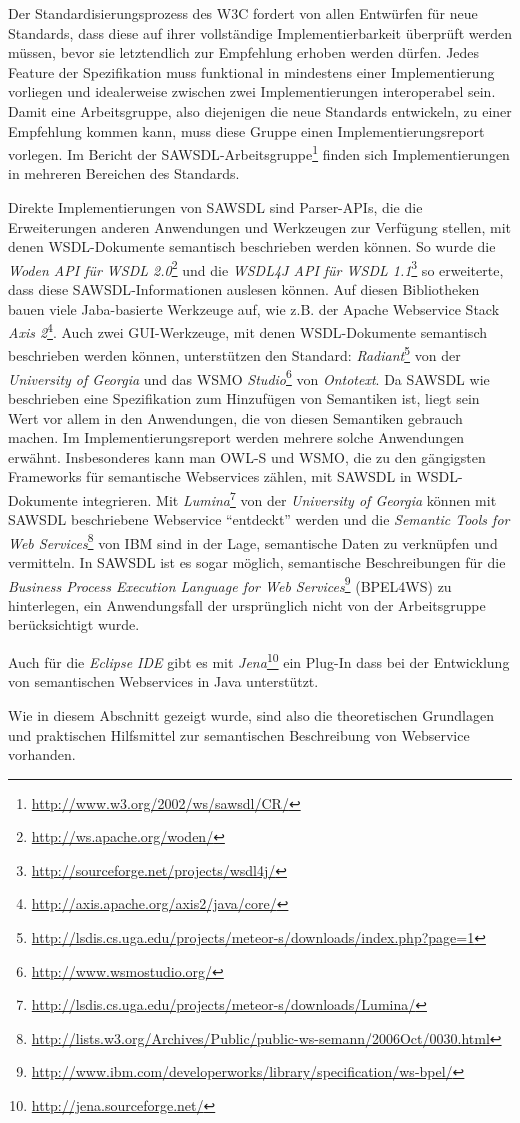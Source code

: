 Der Standardisierungsprozess des \ac{W3C} fordert von allen Entwürfen für neue Standards, dass diese auf ihrer vollständige Implementierbarkeit überprüft werden müssen, bevor sie letztendlich zur Empfehlung erhoben werden dürfen. Jedes Feature der Spezifikation muss funktional in mindestens einer Implementierung vorliegen und idealerweise zwischen zwei Implementierungen interoperabel sein. Damit eine Arbeitsgruppe, also diejenigen die neue Standards entwickeln, zu einer Empfehlung kommen kann, muss diese Gruppe einen Implementierungsreport vorlegen. Im Bericht der \ac{SAWSDL}-Arbeitsgruppe\footnote{\url{http://www.w3.org/2002/ws/sawsdl/CR/}} finden sich Implementierungen in mehreren Bereichen des Standards.

Direkte Implementierungen von \ac{SAWSDL} sind Parser-\ac{API}s, die die Erweiterungen anderen Anwendungen und Werkzeugen zur Verfügung stellen, mit denen \ac{WSDL}-Dokumente semantisch beschrieben werden können. So wurde die \emph{Woden API für WSDL 2.0}\footnote{\url{http://ws.apache.org/woden/}} und die \emph{WSDL4J API für WSDL
1.1}\footnote{\url{http://sourceforge.net/projects/wsdl4j/}} so erweiterte, dass diese \ac{SAWSDL}-Informationen auslesen können. Auf diesen Bibliotheken bauen viele Jaba-basierte Werkzeuge auf, wie z.B. der Apache Webservice Stack \emph{Axis 2}\footnote{\url{http://axis.apache.org/axis2/java/core/}}. Auch zwei GUI-Werkzeuge, mit denen \ac{WSDL}-Dokumente semantisch beschrieben werden können, unterstützen den Standard: \emph{Radiant}\footnote{\url{http://lsdis.cs.uga.edu/projects/meteor-s/downloads/index.php?page=1}} von der \emph{University of Georgia} und das \acl{WSMO} \emph{Studio}\footnote{\url{http://www.wsmostudio.org/}} von \emph{Ontotext}. Da \ac{SAWSDL} wie beschrieben eine Spezifikation zum Hinzufügen von Semantiken ist, liegt sein Wert vor allem in den Anwendungen, die von diesen Semantiken gebrauch machen. Im Implementierungsreport werden mehrere solche Anwendungen erwähnt.
Insbesonderes kann man \ac{OWL-S} und \ac{WSMO}, die zu den gängigsten Frameworks für semantische Webservices zählen,  mit \ac{SAWSDL} in \ac{WSDL}-Dokumente integrieren. Mit \emph{Lumina}\footnote{\url{http://lsdis.cs.uga.edu/projects/meteor-s/downloads/Lumina/}} von der \emph{University of Georgia} können mit \ac{SAWSDL} beschriebene Webservice "`entdeckt"' werden und die \emph{Semantic Tools for Web Services}\footnote{\url{http://lists.w3.org/Archives/Public/public-ws-semann/2006Oct/0030.html}} von IBM sind in der Lage, semantische Daten zu verknüpfen und vermitteln.
In \ac{SAWSDL} ist es sogar möglich, semantische Beschreibungen für die \emph{Business Process Execution Language for Web Services}\footnote{\url{http://www.ibm.com/developerworks/library/specification/ws-bpel/}} (BPEL4WS) zu hinterlegen, ein Anwendungsfall der ursprünglich nicht von der Arbeitsgruppe berücksichtigt wurde. \cite[S.63]{ky-sawsdl}

Auch für die \emph{Eclipse IDE} gibt es mit \emph{Jena}\footnote{\url{http://jena.sourceforge.net/}} ein Plug-In dass bei der Entwicklung von semantischen Webservices in Java unterstützt.

\bigskip

Wie in diesem Abschnitt gezeigt wurde, sind also die theoretischen Grundlagen und praktischen Hilfsmittel zur semantischen Beschreibung von Webservice vorhanden.
